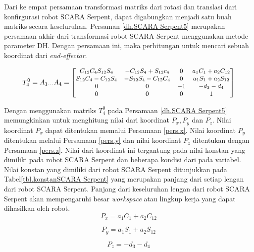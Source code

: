 Dari ke empat persamaan transformasi matriks dari rotasi dan translasi dari konfirgurasi robot SCARA Serpent, dapat digabungkan menjadi satu buah matriks secara keseluruhan. Persaman \ref{dh.SCARA Serpent5} merupakan persamaan akhir dari transformasi robot SCARA Serpent menggunakan metode parameter DH. Dengan persamaan ini, maka perhitungan untuk mencari sebuah koordinat dari \textit{end-effector}.

\begin{equation}
\small
T_{4}^{0}=A_{1} ... A_{4} =
\begin{bmatrix}
C_{12}C_{4}S_{12}S_{4}&-C_{12}S_{4}+S_{12}c_{4}  & 0  & a_{1}C_{1}+a_{2}C_{12} \\ 
S_{12}C_{4}-C_{12}S_{4}&-S_{12}S_{4}-C_{12}C_{4} &0  &a_{1}S_{1}+a_{2}S_{12} \\ 
0 & 0 & -1 & -d_{3}-d_{4}\\ 
0 &0  &0  &1 
\end{bmatrix}
\label{dh.SCARA Serpent5}
\end{equation}

Dengan menggunakan matriks $T_{4}^{0}$ pada Persamaan \ref{dh.SCARA Serpent5} memungkinkan untuk menghitung nilai dari koordinat $P_{x}, P_{y}$ dan $P_{z}$. Nilai koordinat $P_{x}$ dapat ditentukan memalui Persamaan \ref{pers.x}. Nilai koordinat $P_{y}$ ditentukan melalui Persamaan \ref{pers.y} dan nilai koordinat $P_{z}$ ditentukan dengan Persamaan \ref{pers.z}. Nilai dari koordinat ini tergantung pada nilai konstan yang dimiliki pada robot SCARA Serpent dan beberapa kondisi dari pada variabel. Nilai konstan yang dimiliki dari robot SCARA Serpent ditunjukkan pada Tabel\ref{tbl.konstanSCARA Serpent} yang merupakan panjang dari setiap lengan dari robot SCARA Serpent. Panjang dari keseluruhan lengan dari robot SCARA Serpent akan mempengaruhi besar \textit{workspace} atau lingkup kerja yang dapat dihasilkan oleh robot.
\\

\begin{equation}
P_{x}=a_{1}C_{1}+a_{2}C_{12}
\label{pers.x}
\end{equation}

\begin{equation}
P_{y}=a_{1}S_{1}+a_{2}S_{12}
\label{pers.y}
\end{equation}

\begin{equation}
P_{z}=-d_{3}-d_{4}
\label{pers.z}
\end{equation}

